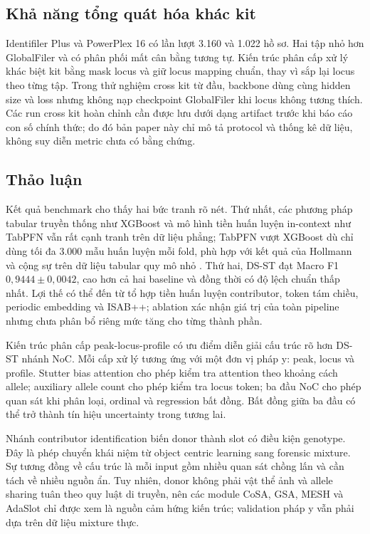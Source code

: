 \documentclass[12pt,a4paper]{article}
\begin{document}
\subsection{Khả năng tổng quát hóa khác kit}

Identifiler Plus và PowerPlex 16 có lần lượt 3.160 và 1.022 hồ sơ. Hai tập nhỏ hơn GlobalFiler và có phân phối mất cân bằng tương tự. Kiến trúc phân cấp xử lý khác biệt kit bằng mask locus và giữ locus mapping chuẩn, thay vì sắp lại locus theo từng tập. Trong thử nghiệm cross kit từ đầu, backbone dùng cùng hidden size và loss nhưng không nạp checkpoint GlobalFiler khi locus không tương thích. Các run cross kit hoàn chỉnh cần được lưu dưới dạng artifact trước khi báo cáo con số chính thức; do đó bản paper này chỉ mô tả protocol và thống kê dữ liệu, không suy diễn metric chưa có bằng chứng.

\subsection{Thảo luận}

Kết quả benchmark cho thấy hai bức tranh rõ nét. Thứ nhất, các phương pháp tabular truyền thống như XGBoost và mô hình tiền huấn luyện in-context như TabPFN vẫn rất cạnh tranh trên dữ liệu phẳng; TabPFN vượt XGBoost dù chỉ dùng tối đa 3.000 mẫu huấn luyện mỗi fold, phù hợp với kết quả của Hollmann và cộng sự trên dữ liệu tabular quy mô nhỏ \cite{hollmann2023}. Thứ hai, DS-ST đạt Macro F1 $0{,}9444\pm0{,}0042$, cao hơn cả hai baseline và đồng thời có độ lệch chuẩn thấp nhất. Lợi thế có thể đến từ tổ hợp tiền huấn luyện contributor, token tám chiều, periodic embedding và ISAB++; ablation xác nhận giá trị của toàn pipeline nhưng chưa phân bổ riêng mức tăng cho từng thành phần.

Kiến trúc phân cấp peak-locus-profile có ưu điểm diễn giải cấu trúc rõ hơn DS-ST nhánh NoC. Mỗi cấp xử lý tương ứng với một đơn vị pháp y: peak, locus và profile. Stutter bias attention cho phép kiểm tra attention theo khoảng cách allele; auxiliary allele count cho phép kiểm tra locus token; ba đầu NoC cho phép quan sát khi phân loại, ordinal và regression bất đồng. Bất đồng giữa ba đầu có thể trở thành tín hiệu uncertainty trong tương lai.

Nhánh contributor identification biến donor thành slot có điều kiện genotype. Đây là phép chuyển khái niệm từ object centric learning sang forensic mixture. Sự tương đồng về cấu trúc là mỗi input gồm nhiều quan sát chồng lấn và cần tách về nhiều nguồn ẩn. Tuy nhiên, donor không phải vật thể ảnh và allele sharing tuân theo quy luật di truyền, nên các module CoSA, GSA, MESH và AdaSlot chỉ được xem là nguồn cảm hứng kiến trúc; validation pháp y vẫn phải dựa trên dữ liệu mixture thực.
\end{document}
